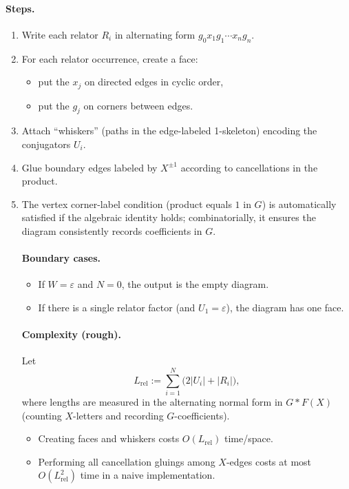 \documentclass[11pt]{article}
\theoremstyle{definition}
\theoremstyle{plain}
\theoremstyle{remark}
\begin{document}
\paragraph{Steps.}
\begin{enumerate}[leftmargin=2.2em]
\item Write each relator $R_i$ in alternating form $g_0 x_1 g_1 \cdots x_n g_n$.
\item For each relator occurrence, create a face:
\begin{itemize}[leftmargin=2em]
\item put the $x_j$ on directed edges in cyclic order,
\item put the $g_j$ on corners between edges.
\end{itemize}
\item Attach ``whiskers'' (paths in the edge-labeled 1-skeleton) encoding the conjugators $U_i$.
\item Glue boundary edges labeled by $X^{\pm1}$ according to cancellations in the product.
\item The vertex corner-label condition (product equals $1$ in $G$) is automatically satisfied if the algebraic identity holds;
combinatorially, it ensures the diagram consistently records coefficients in $G$.


\paragraph{Boundary cases.}
\begin{itemize}[leftmargin=2em]
\item If $W=\varepsilon$ and $N=0$, the output is the empty diagram.
\item If there is a single relator factor (and $U_1=\varepsilon$), the diagram has one face.
\end{itemize}

\paragraph{Complexity (rough).}\cite{howie1981,howie1984}
Let
\[
L_{\mathrm{rel}} := \sum_{i=1}^N \bigl(2|U_i|+|R_i|\bigr),
\]
where lengths are measured in the alternating normal form in $G*F(X)$ (counting $X$-letters and recording $G$-coefficients).
\begin{itemize}[leftmargin=2em]
\item Creating faces and whiskers costs $O(L_{\mathrm{rel}})$ time/space.
\item Performing all cancellation gluings among $X$-edges costs at most $O(L_{\mathrm{rel}}^2)$ time in a naive implementation.
\end{itemize}
\end{enumerate}
\end{document}
